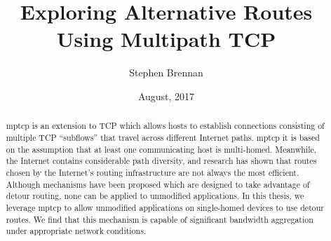 \documentclass{cwru}
\title{Exploring Alternative Routes Using Multipath TCP}
\author{Stephen Brennan}
\date{August, 2017} %
\begin{document}

%

\maketitle
\makeapprovalsheet

\setcounter{tocdepth}{1}
\frontmatter
\tableofcontents

\cleardoublepage
{}
{}
\listoftables
{}
\listoffigures





\acresetall

\begin{abstract}
  \ac{mptcp} is an extension to TCP which allows hosts to establish connections
  consisting of multiple TCP ``subflows'' that travel across different Internet
  paths. \ac{mptcp} it is based on the assumption that at least one
  communicating host is multi-homed. Meanwhile, the Internet contains
  considerable path diversity, and research has shown that routes chosen by the
  Internet's routing infrastructure are not always the most efficient. Although
  mechanisms have been proposed which are designed to take advantage of detour
  routing, none can be applied to unmodified applications. In this thesis, we
  leverage \ac{mptcp} to allow unmodified applications on single-homed devices
  to use detour routes. We find that this mechanism is capable of significant
  bandwidth aggregation under appropriate network conditions.
\end{abstract}
\end{document}
